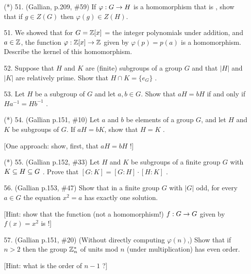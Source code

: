 \documentclass[12pt]{article}
\begin{document}
\begin{description}

\item{(*) 51.} (Gallian, p.209, \#59) If $\varphi:G\rightarrow H$ is a homomorphism that is ,
show that if $g\in Z(G)$ then $\varphi(g)\in Z(H)$.

\msk

\item{51.} We showed that for $G={\mathbb Z}[x]$ = the integer polynomials under addition, and $a\in{\mathbb Z}$, the
function $\varphi:{\mathbb Z}[x]\rightarrow{\mathbb Z}$ given by $\varphi(p)=p(a)$ is a homomorphism. Describe the kernel 
of this homomorphism.

\msk

\item{52.} Suppose that $H$ and $K$ are (finite) subgroups of a group $G$ and that $|H|$ and $|K|$
are relatively prime. Show that $H \cap K = \{e_G\}$ .

\msk

\item{53.} Let $H$ be a subgroup of $G$ and let $a,b\in G$. Show that $aH = bH$ if
and only if $Ha^{-1} = Hb^{-1}$ .

\msk

\item{(*) 54.} (Gallian p.151, \#10) Let $a$ and $b$ be elements of a group $G$, and let $H$ and $K$ be subgroups of
$G$. If $aH = bK$, show that $H = K$ .

\ssk

\item{\spc} [One approach: show, first, that $aH=bH$ !]

\msk

\item{(*) 55.} (Gallian p.152, \#33) Let $H$ and $K$ be subgroups of a finite group $G$ with $K \subseteq H \subseteq G$ .
Prove that $[G:K] = [G:H]\cdot[H:K]$ .

\msk

\item{56.} (Gallian p.153, \#47) Show that in a finite group $G$ with $|G|$ odd, for every $a\in G$ the equation $x^2=a$ has exactly
one solution.

\ssk

\item{\spc} [Hint: show that the function (not a homomorphism!) $f:G\rightarrow G$ given by $f(x)=x^2$ is  !]

\msk

\item{57.} (Gallian p.151, \#20) (Without directly computing $\varphi(n)$,) Show that if $n>2$ then 
the group ${\mathbb Z}_n^*$ of units mod $n$ (under multiplication) has even order.

\ssk

\item{\spc} [Hint: what is the order of $n-1$ ?]


\end{description}
\vfill
\end{document}
